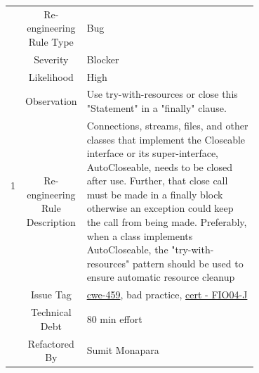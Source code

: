 \documentclass[12pt,letterpaper]{report}
\begin{document}
{\begin{table}
    \begin{tabular}{|c|c|p{0.7\linewidth}|}
    \hline   
    \multirow{8}{*}{1}
        & Re-engineering Rule Type & Bug \\
    \cline{2-3}
       & Severity &  Blocker \\
    \cline{2-3}
       & Likelihood &  High \\
    \cline{2-3}
       & Observation & Use try-with-resources or close this "Statement" in a "finally" clause. \\
    \cline{2-3}
        & Re-engineering Rule Description & Connections, streams, files, and other classes that implement the Closeable interface or its super-interface, AutoCloseable, needs to be closed after use. Further, that close call must be made in a finally block otherwise an exception could keep the call from being made. Preferably, when a class implements AutoCloseable, the "try-with-resources" pattern should be used to ensure automatic resource cleanup \\
    \cline{2-3}
       & Issue Tag & \href{https://cwe.mitre.org/data/definitions/459}{cwe-459}, bad practice, \href{https://wiki.sei.cmu.edu/confluence/display/java/FIO04-J.+Release+resources+when+they+are+no+longer+needed}{cert - FIO04-J}  \\
    \cline{2-3}
       & Technical Debt & 80 min effort  \\
    \cline{2-3}
       & Refactored By & Sumit Monapara \\
    \hline
    \end{tabular}
\end{table}

}
\end{document}
